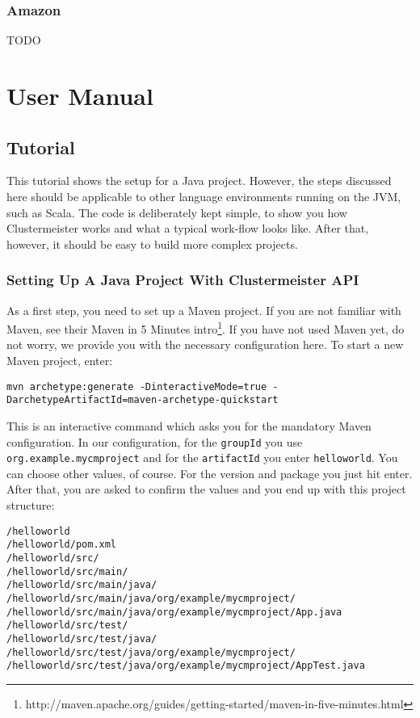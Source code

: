 \documentclass{article}
\begin{document}
\subsubsection{Amazon}

TODO

\section{User Manual}

\subsection{Tutorial}

\label{tutorial}

This tutorial shows the setup for a Java project. However, the steps discussed here should be applicable to other language environments running on the JVM, such as Scala. The code is deliberately kept simple, to show you how Clustermeister works and what a typical work-flow looks like. After that, however, it should be easy to build more complex projects.

\subsubsection{Setting Up A Java Project With Clustermeister API}

As a first step, you need to set up a Maven project. If you are not familiar with Maven, see their Maven in 5 Minutes intro\footnote{http://maven.apache.org/guides/getting-started/maven-in-five-minutes.html}. 
If you have not used Maven yet, do not worry, we provide you with the necessary configuration here. To start a new Maven project, enter:

\begin{lstlisting}[breaklines=true, backgroundcolor=\color{lbcolor}]
 mvn archetype:generate -DinteractiveMode=true -DarchetypeArtifactId=maven-archetype-quickstart
\end{lstlisting}

This is an interactive command which asks you for the mandatory Maven configuration. In our configuration, for the \texttt{groupId} you use \texttt{org.example.mycmproject} and for the \texttt{artifactId} you enter \texttt{helloworld}. You can choose other values, of course. For the version and package you just hit enter. After that, you are asked to confirm the values and you end up with this project structure:

\begin{lstlisting}[breaklines=true, backgroundcolor=\color{lbcolor}]
/helloworld
/helloworld/pom.xml
/helloworld/src/
/helloworld/src/main/
/helloworld/src/main/java/
/helloworld/src/main/java/org/example/mycmproject/
/helloworld/src/main/java/org/example/mycmproject/App.java
/helloworld/src/test/
/helloworld/src/test/java/
/helloworld/src/test/java/org/example/mycmproject/
/helloworld/src/test/java/org/example/mycmproject/AppTest.java
\end{lstlisting}
\end{document}

